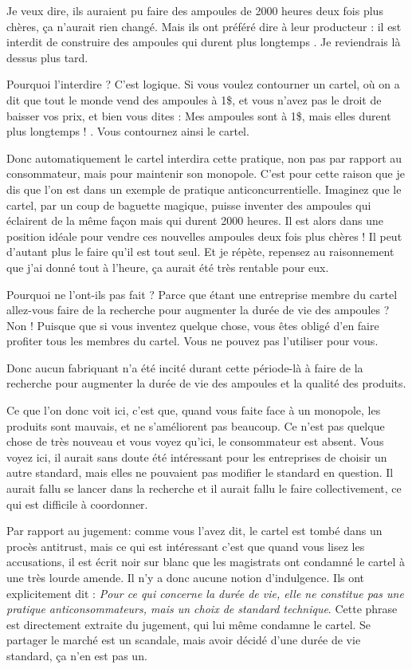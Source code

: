 \begin{small}
Je veux dire, ils auraient pu faire des ampoules de 2000 heures deux fois plus chères, ça n'aurait rien changé. Mais ils ont préféré dire à leur producteur :  \og il est interdit de construire des ampoules qui durent plus longtemps \fg{}. Je reviendrais là dessus plus tard.


Pourquoi l'interdire ? C'est logique. Si vous voulez contourner un cartel, où on a dit que tout le monde vend des ampoules à 1\$, et vous n'avez pas le droit de baisser vos prix, et bien vous dites :  \og Mes ampoules sont à 1\$, mais elles durent plus longtemps ! \fg{}. Vous contournez ainsi le cartel.

\smallbreak

Donc automatiquement le cartel interdira cette pratique, non pas par rapport au consommateur, mais pour maintenir son monopole. C'est pour cette raison que je dis que l'on est dans un exemple de pratique anticoncurrentielle. Imaginez que le cartel, par un coup de baguette magique, puisse inventer des ampoules qui éclairent de la même façon mais qui durent 2000 heures. Il est alors dans une position idéale pour vendre ces nouvelles ampoules deux fois plus chères ! Il peut d'autant plus le faire qu'il est tout seul. Et je répète, repensez au raisonnement que j'ai donné tout à l'heure, ça aurait été très rentable pour eux. 

Pourquoi  ne l'ont-ils pas fait ? Parce que étant une entreprise membre du cartel allez-vous faire de la recherche pour augmenter la durée de vie des ampoules ? Non ! Puisque que si vous inventez quelque chose, vous êtes obligé d'en faire profiter tous les membres du cartel. Vous ne pouvez pas l'utiliser pour vous.


Donc aucun fabriquant n'a été incité durant cette période-là à faire de la recherche pour augmenter la durée de vie des ampoules et la qualité des produits.
\smallbreak 

Ce que l'on donc voit ici, c'est que, quand vous faite face à un monopole,  les produits sont mauvais, et ne s'améliorent pas beaucoup. Ce n'est pas quelque chose de très nouveau et vous voyez qu'ici, le consommateur est absent. Vous voyez ici, il aurait sans doute été intéressant pour les entreprises de choisir un autre standard, mais elles ne pouvaient pas modifier le standard en question. Il aurait fallu se lancer dans la recherche et il aurait fallu le faire collectivement, ce qui est difficile à coordonner.

\medbreak

Par rapport au jugement: comme vous l'avez dit, le cartel est tombé dans un procès antitrust, mais ce qui est intéressant c'est que quand vous lisez les accusations, il est écrit noir sur blanc que les magistrats ont condamné le cartel à une très lourde amende. Il n'y a donc aucune notion d'indulgence. Ils ont explicitement dit :  \textit{Pour ce qui concerne la durée de vie, elle ne constitue pas une pratique anticonsommateurs, mais un choix de standard technique}. Cette phrase est directement extraite du jugement, qui lui même condamne le cartel. Se partager le marché est un scandale, mais avoir décidé d'une durée de vie standard, ça n'en est pas un.


\end{small}
